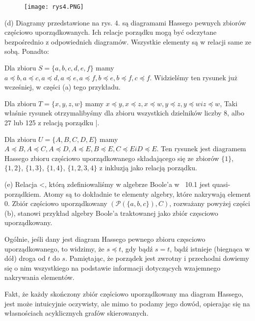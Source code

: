 \documentclass[14pt]{extarticle}
\begin{document}
\begin{changemargin}{160pt}{0pt}
\begin{figure}[h!]
\centering
\texttt{[image: rys4.PNG]}
\caption{}
\label{fig:universe}
\end{figure}

\qquad (d) Diagramy przedstawione na rys. 4. są diagramami Hassego pewnych zbiorów częściowo uporządkowanych. Ich relacje porządku mogą być odczytane bezpośrednio z odpowiednich diagramów. Wszystkie elementy są w relacji same ze sobą. Ponadto:

\qquad Dla zbioru $\mathit{S}=\{a,b,c,d,e,f\}$ mamy $\mathit{a} \preceq \mathit{b}, \mathit{a} \preceq \mathit{c}, \mathit{a} \preceq \mathit{d}, \mathit{a} \preceq \mathit{e}, \mathit{a} \preceq \mathit{f}, \mathit{b} \preceq \mathit{e}, \mathit{b} \preceq \mathit{f}, \mathit{c} \preceq \mathit{f}$. Widzielśmy ten rysunek już wcześniej, w części (a) tego przykładu.

\qquad Dla zbioru $\mathit{T} = \{\mathit{x}, \mathit{y}, \mathit{z}, \mathit{w}\}$ mamy $\mathit{x} \preceq \mathit{y}, \mathit{x} \preceq \mathit{z}, \mathit{x} \preceq \mathit{w}, \mathit{y} \preceq \mathit{z}, \mathit{y} \preceq \mathit{w} i \mathit{z} \preceq \mathit{w}$, Taki właśnie rysunek otrzymalibyśmy dla zbioru wszystkich dzielników liczby 8, albo 27 lub 125 z relacją porządku |.

\qquad Dla zbioru $\mathit{U} = \{\mathit{A}, \mathit{B}, \mathit{C}, \mathit{D}, \mathit{E}\}$ mamy $\mathit{A} \preceq \mathit{B}, \mathit{A} \preceq \mathit{C}, \mathit{A} \preceq \mathit{D}, \mathit{A} \preceq \mathit{E}, \mathit{B} \preceq \mathit{E}, \mathit{C} \preceq \mathit{E} i \mathit{D} \preceq \mathit{E}$. Ten rysunek jest diagramem Hassego zbioru częściowo uporządkowanego składającego się ze zbiorów $\{1\}$, $\{1,2\}$, $\{1,3\}$, $\{1,4\}$, $\{1,2,3,4\}$ z inkluzją jako relacją porządku.

\qquad (e) Relacja <, którą zdefiniowaliśmy w algebrze Boole'a w \textsection ~10.1 jest quasi-porządkiem. Atomy są to dokładnie te elementy algebry, które nakrywają element 0. Zbiór częściowo uporządkowany $(\mathcal{P}(\{a,b,c\}), C)$, rozważany powyżej części (b),
stanowi przykład algebry Boole'a traktowanej jako zbiór częsciowo uporządkowany.\newline

\qquad Ogólnie, jeśli dany jest diagram Hassego pewnego zbioru częsciowo uporządkowanego, to widzimy, że $\mathit{s} \preceq \mathit{t}$, gdy bądź $\mathit{s} = \mathit{t}$, bądź istnieje (biegnąca w dół) droga od $\mathit{t}$ do $\mathit{s}$. Pamiętając, że porządek jest zwrotny i przechodni dowiemy się o nim wszystkiego na podstawie informacji dotyczących wzajemnego nakrywania elementów.

\qquad Fakt, że każdy skończony zbiór częściowo uporządkowany ma diagram Hassego, jest może intuicyjnie oczywisty, ale mimo to podamy jego dowód, opierając się na własnościach acyklicznych grafów skierowanych.
\end{changemargin}
\end{document}
